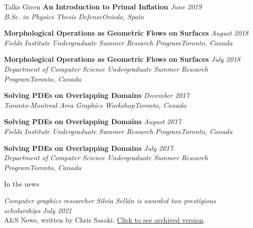 \documentclass{resume} %
\begin{document}
\begin{rSection}{Talks Given}
{\bf An Introduction to Primal Inflation} \hfill {\em June 2019}\\ 
{\it B.Sc. in Physics Thesis Defense}\hfill {\em Oviedo, Spain}

{\bf Morphological Operations as Geometric Flows on Surfaces} \hfill {\em August 2018}\\ 
{\it Fields Institute Undergraduate Summer Research Program}\hfill {\em Toronto, Canada}

{\bf Morphological Operations as Geometric Flows on Surfaces} \hfill {\em July 2018}\\ 
{\it Department of Computer Science Undergraduate Summer Research Program}\hfill {\em Toronto, Canada}

{\bf Solving PDEs on Overlapping Domains} \hfill {\em December 2017}\\ 
{\it Toronto-Montreal Area Graphics Workshop}\hfill {\em Toronto, Canada}

{\bf Solving PDEs on Overlapping Domains} \hfill {\em August 2017}\\ 
{\it Fields Institute Undergraduate Summer Research Program}\hfill {\em Toronto, Canada}

{\bf Solving PDEs on Overlapping Domains} \hfill {\em July 2017}\\ 
{\it Department of Computer Science Undergraduate Summer Research Program}\hfill {\em Toronto, Canada}

\end{rSection}

\begin{rSection}{In the news}

{\it Computer graphics researcher Silvia Sellán is awarded two prestigious scholarships} \hfill {\em July 2021}\\ 
A\&S News, written by Chris Sasaki. \href{https://web.cs.toronto.edu/news-events/news/silvia-sellan-scholarships}{Click to see archived version}. 

\end{rSection}
\end{document}
